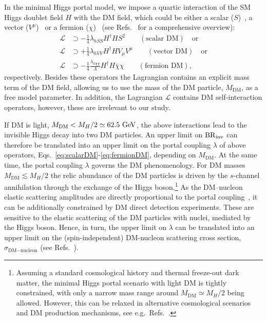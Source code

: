\documentclass[../report.tex]{subfiles}
\begin{document}
In the minimal Higgs portal model, we impose a quartic interaction of the SM Higgs doublet field $H$ with the DM field, which could be either a scalar ($S$)~\cite{Silveira:1985rk}, a vector ($V^\mu$)~\cite{Lebedev:2011iq} or a fermion ($\chi$)~\cite{Kim:2006af} (see Refs.~\cite{Kanemura:2010sh,Djouadi:2011aa} for a comprehensive overview):
\begin{align}
\mathcal{L} &\supset -\tfrac{1}{4} \lambda_{hSS} H^\dagger H S^2 \qquad (\mbox{scalar~DM}) \quad \mbox{or} \label{eq:scalarDM}\\
\mathcal{L} &\supset +\tfrac{1}{4}  \lambda_{hVV} H^\dagger H V_\mu V^\mu \qquad (\mbox{vector~DM}) \quad \mbox{or} \label{eq:vectorDM}\\
\mathcal{L} &\supset -\tfrac{1}{4}  \tfrac{\lambda_{h\chi\chi}}{\Lambda} H^\dagger H \bar{\chi} \chi \qquad (\mbox{fermion~DM}), \label{eq:fermionDM}
\end{align}
respectively. Besides these operators the Lagrangian contains an explicit mass term of the DM field, allowing us to use the mass of the DM particle, $M_\text{DM}$, as a free model parameter. In addition, the Lagrangian $\mathcal{L}$ contains DM self-interaction operators, however, these are irrelevant to our study.


If DM is light, $M_\text{DM} < M_H /2 \simeq 62.5~\text{GeV}$, the above interactions lead to the invisible Higgs decay into two DM particles. An upper limit on $\mathrm{BR}_\mathrm{inv}$ can therefore be translated into an upper limit on the portal coupling $\lambda$ of above operators, Eqs.~\eqref{eq:scalarDM}-\eqref{eq:fermionDM}, depending on $M_\text{DM}$.  At the same time, the portal coupling $\lambda$ governs the DM phenomenology. For DM masses $M_\text{DM} \lesssim M_H/2$ the relic abundance of the DM particles is driven by the $s$-channel annihilation through the exchange of the Higgs boson.\footnote{Assuming a standard cosmological history and thermal freeze-out dark matter, the minimal Higgs portal scenario with light DM is tightly constrained, with only a narrow mass range around $M_\text{DM} \simeq M_H/2$ being  allowed. However, this can be relaxed in alternative cosmological scenarios and DM production mechanisms, see e.g.~Refs.~\cite{Hardy:2018bph,Bernal:2018ins,Bernal:2018kcw}.} As the DM--nucleon elastic scattering amplitudes are directly proportional to the portal coupling~\cite{Kanemura:2010sh}, it can be additionally constrained by DM direct detection experiments.  These are sensitive to the elastic scattering of the DM particles with nuclei, mediated by the Higgs boson. Hence, in turn, the upper limit on $\lambda$ can be translated into an upper limit on the (spin-independent) DM-nucleon scattering cross section, $\sigma_{\text{DM}-\text{nucleon}}$ (see Refs.~\cite{Kanemura:2010sh,Djouadi:2011aa}).
\end{document}
